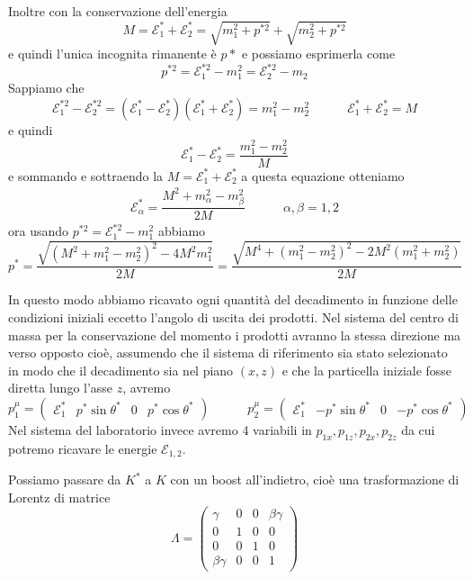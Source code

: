 \documentclass[12pt,a4paper,titlepage, twoside, openright]{book}
\numberwithin{equation}{chapter}
\begin{document}
Inoltre con la conservazione dell'energia
\[
M=\mathcal{E}_1^*+\mathcal{E}_2^*=\sqrt{m_1^2+p^{*2}}+\sqrt{m_2^2+p^{*2}}
\]
e quindi l'unica incognita rimanente è $p*$ e possiamo esprimerla come
\[
p^{*2}=\mathcal{E}_1^{*2}-m_1^2=\mathcal{E}_2^{*2}-m_2
\]
Sappiamo che
\[
\mathcal{E}_1^{*2}-\mathcal{E}_2^{*2}=\left( \mathcal{E}_1^* - \mathcal{E}_2^* \right)\left( \mathcal{E}_1^* + \mathcal{E}_2^* \right)=m_1^2 - m_2^2 \qquad \quad \mathcal{E}_1^* +\mathcal{E}_2^* = M
\]
e quindi
\begin{equation}
\mathcal{E}_1^*-\mathcal{E}_2^*=\dfrac{m_1^2-m_2^2}{M}
\end{equation}
e sommando e sottraendo la $M=\mathcal{E}_1^*+\mathcal{E}_2^*$ a questa equazione otteniamo
\begin{gather}
\mathcal{E}_\alpha^*=\dfrac{M^2+m_\alpha^2-m_\beta^2}{2M} \qquad \quad \alpha,\beta=1,2
\end{gather}
ora usando $p^{*2}=\mathcal{E}_1^{*2}-m_1^2$ abbiamo
\begin{equation}
p^*=\dfrac{\sqrt{(M^2+m_1^2-m_2^2)^2-4M^2m_1^2}}{2M}=\dfrac{\sqrt{ M^4 + (m_1^2-m_2^2)^2 -2M^2(m_1^2+m_2^2)}}{2M}
\end{equation}

In questo modo abbiamo ricavato ogni quantità del decadimento in funzione delle condizioni iniziali eccetto l'angolo di uscita dei prodotti.
Nel sistema del centro di massa per la conservazione del momento i prodotti avranno la stessa direzione ma verso opposto cioè, assumendo che il sistema di riferimento sia stato selezionato in modo che il decadimento sia nel piano $(x,z)$ e che la particella iniziale fosse diretta lungo l'asse $z$, avremo
\[
p_1^\mu=\left(\begin{array}{cccc}
\mathcal{E}_1^* & p^*\sin{\theta^*} & 0 & p^*\cos{\theta^*}
\end{array}\right) \qquad \quad
p_2^\mu=\left(\begin{array}{cccc}
\mathcal{E}_1^* & -p^*\sin{\theta^*} & 0 & -p^*\cos{\theta^*}
\end{array}\right)
\]
Nel sistema del laboratorio invece avremo 4 variabili in $p_{1x},p_{1z},p_{2x},p_{2z}$ da cui  potremo ricavare le energie $\mathcal{E}_{1,2}$.

Possiamo passare da $K^*$ a $K$ con un boost all'indietro, cioè una trasformazione di Lorentz di matrice
\[
\Lambda=\left(\begin{array}{cccc}
\gamma & 0 & 0 & \beta\gamma \\
0 & 1 & 0 & 0 \\
0 & 0 & 1 & 0 \\
\beta\gamma & 0 & 0 &1
\end{array}\right)
\]
\end{document}
